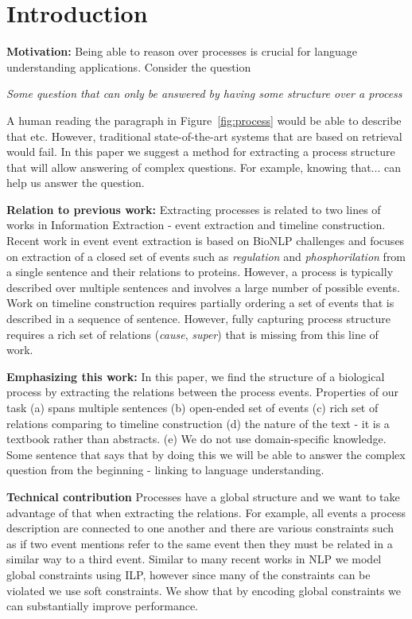 \section{Introduction}

\textbf{Motivation:} Being able to reason over processes is crucial for language understanding applications. Consider the question 

\begin{description}
\item \emph{Some question that can only be answered by having some structure over a process}
\end{description}

A human reading the paragraph in Figure~\ref{fig:process} would be able to describe that etc. However, traditional state-of-the-art systems that are based on retrieval would fail. In this paper we suggest a method for extracting a process structure that will allow answering of complex questions. For example, knowing that... can help us answer the question.

\textbf{Relation to previous work:} 
Extracting processes is related to two lines of works in Information Extraction - event extraction and timeline construction. Recent work in event event extraction \cite{riedel11fast,Mcclosky11} is based on BioNLP challenges and focuses on extraction of a closed set of events such as \emph{regulation} and \emph{phosphorilation} from a single sentence and their relations to proteins. However, a process is typically described over multiple sentences and involves a large number of possible events. Work on timeline construction \cite{Do12,Mcclosky12} requires partially ordering a set of events that is described in a sequence of sentence. However, fully capturing process structure requires a rich set of relations (\emph{cause}, \emph{super}) that is missing from this line of work.

\textbf{Emphasizing this work:} In this paper, we find the structure of a biological process by extracting the relations between the process events. Properties of our task (a) spans multiple sentences (b) open-ended set of events (c) rich set of relations comparing to timeline construction (d) the nature of the text - it is a textbook rather than abstracts. (e) We do not use domain-specific knowledge. Some sentence that says that by doing this we will be able to answer the complex question from the beginning - linking to language understanding.

\textbf{Technical contribution} Processes have a global structure and we want to take advantage of that when extracting the relations. For example, all events a process description are connected to one another and there are various constraints such as if two event mentions refer to the same event then they must be related in a similar way to a third event. Similar to  many recent works in NLP \cite{} we model global constraints using ILP, however since many of the constraints can be violated we use soft constraints. We show that by encoding global constraints we can substantially improve performance.

